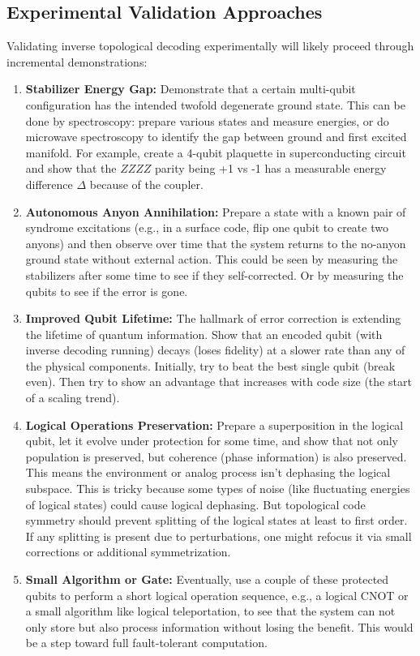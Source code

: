 \documentclass[11pt]{article}
\begin{document}
\subsection{Experimental Validation Approaches}
Validating inverse topological decoding experimentally will likely proceed through incremental demonstrations:
\begin{enumerate}
    \item \textbf{Stabilizer Energy Gap:} Demonstrate that a certain multi-qubit configuration has the intended twofold degenerate ground state. This can be done by spectroscopy: prepare various states and measure energies, or do microwave spectroscopy to identify the gap between ground and first excited manifold. For example, create a 4-qubit plaquette in superconducting circuit and show that the $ZZZZ$ parity being +1 vs -1 has a measurable energy difference $\Delta$ because of the coupler.
    \item \textbf{Autonomous Anyon Annihilation:} Prepare a state with a known pair of syndrome excitations (e.g., in a surface code, flip one qubit to create two anyons) and then observe over time that the system returns to the no-anyon ground state without external action. This could be seen by measuring the stabilizers after some time to see if they self-corrected. Or by measuring the qubits to see if the error is gone.
    \item \textbf{Improved Qubit Lifetime:} The hallmark of error correction is extending the lifetime of quantum information. Show that an encoded qubit (with inverse decoding running) decays (loses fidelity) at a slower rate than any of the physical components. Initially, try to beat the best single qubit (break even). Then try to show an advantage that increases with code size (the start of a scaling trend).
    \item \textbf{Logical Operations Preservation:} Prepare a superposition in the logical qubit, let it evolve under protection for some time, and show that not only population is preserved, but coherence (phase information) is also preserved. This means the environment or analog process isn't dephasing the logical subspace. This is tricky because some types of noise (like fluctuating energies of logical states) could cause logical dephasing. But topological code symmetry should prevent splitting of the logical states at least to first order. If any splitting is present due to perturbations, one might refocus it via small corrections or additional symmetrization.
    \item \textbf{Small Algorithm or Gate:} Eventually, use a couple of these protected qubits to perform a short logical operation sequence, e.g., a logical CNOT or a small algorithm like logical teleportation, to see that the system can not only store but also process information without losing the benefit. This would be a step toward full fault-tolerant computation.
\end{enumerate}
\end{document}
